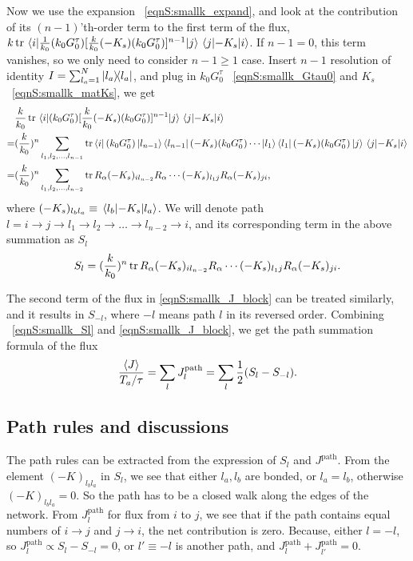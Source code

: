 \documentclass[
 amsmath,amssymb,
 aps,
 pre,
 longbibliography,
 10pt, onecolumn,
 notitlepage
]{revtex4-1}
\begin{document}
Now we use the expansion \eqnname~\eqref{eqnS:smallk_expand}, and look at the contribution of its $(n-1)$'th-order term to the first term of the flux, $k \tr \mel{i}{\frac{1}{k_0} (k_0 G^\tau_0) [\frac{k}{k_0}(-K_s)(k_0 G^\tau_0)]^{n-1}}{j} \mel{j}{-K_s}{i}$. 
If $n-1=0$, this term vanishes, so we only need to consider $n-1 \ge 1$ case. 
Insert $n-1$ resolution of identity $I = \sum_{l_a=1}^N \ketbra{l_a}{l_a}$, and plug in $k_0 G^\tau_0$ \eqnname~\eqref{eqnS:smallk_Gtau0} and $K_s$ \eqnname~\eqref{eqnS:smallk_matKs}, we get
\begin{equation} 
    \begin{split}
    &\frac{k}{k_0} \tr \mel{i}{(k_0 G^\tau_0) [\frac{k}{k_0}(-K_s)(k_0 G^\tau_0)]^{n-1}}{j} \mel{j}{-K_s}{i} \\
    =& (\frac{k}{k_0})^n \sum_{l_1,l_2,\dots,l_{n-1}} \tr \bra{i} (k_0G^\tau_0) \ket{l_{n-1}}\bra{l_{n-1}} (-K_s) (k_0G^\tau_0) \cdots \ket{l_1}\bra{l_1} (-K_s) (k_0G^\tau_0) \ket{j} \mel{j}{-K_s}{i}\\
    =& (\frac{k}{k_0})^n \sum_{l_1,l_2,\dots,l_{n-2}} \tr R_\alpha (-K_s)_{il_{n-2}} R_\alpha \cdots (-K_s)_{l_1j} R_\alpha (-K_s)_{ji},
    \end{split}
\end{equation}
where $(-K_s)_{l_bl_a} \equiv \mel{l_b}{-K_s}{l_a}$.
We will denote path $l = i\rightarrow j\rightarrow l_1\rightarrow l_2\rightarrow \dots \rightarrow l_{n-2}\rightarrow i$, and its corresponding term in the above summation as $S_l$
\begin{equation} \label{eqnS:smallk_Sl}
    S_l = (\frac{k}{k_0})^n \tr R_\alpha (-K_s)_{il_{n-2}} R_\alpha \cdots (-K_s)_{l_1j} R_\alpha (-K_s)_{ji}.
\end{equation}

The second term of the flux in \eqref{eqnS:smallk_J_block} can be treated similarly, and it results in $S_{-l}$, where $-l$ means path $l$ in its reversed order.
Combining \eqnname~\eqref{eqnS:smallk_Sl} and \eqref{eqnS:smallk_J_block}, we get the path summation formula of the flux
\begin{equation} \label{eqnS:smallk_path_sum}
    \frac{\expval{J}}{T_a/\tau} = \sum_l J^\text{path}_l
    = \sum_l \frac{1}{2}(S_l - S_{-l}).
\end{equation}

\subsection{Path rules and discussions}
The path rules can be extracted from the expression of $S_l$ and $J^\text{path}$.
From the element $(-K)_{l_bl_a}$ in $S_l$, we see that either $l_a,l_b$ are bonded, or $l_a=l_b$, otherwise $(-K)_{l_bl_a}=0$.
So the path has to be a closed walk along the edges of the network.
From $J^\text{path}_l$ for flux from $i$ to $j$, we see that if the path contains equal numbers of $i\rightarrow j$ and $j\rightarrow i$, the net contribution is zero. Because, either $l=-l$, so $J^\text{path}_l \propto S_l - S_{-l} = 0$, or $l'\equiv -l$ is another path, and $J^\text{path}_l + J^\text{path}_{l'} = 0$.
\end{document}
